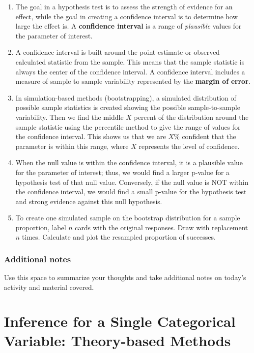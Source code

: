 \documentclass[
]{report}
\begin{document}
\begin{enumerate}
\def\labelenumi{\arabic{enumi}.}
\item
  The goal in a hypothesis test is to assess the strength of evidence for an effect, while the goal in creating a confidence interval is to determine how large the effect is. A \textbf{confidence interval} is a range of \emph{plausible} values for the parameter of interest.
\item
  A confidence interval is built around the point estimate or observed calculated statistic from the sample. This means that the sample statistic is always the center of the confidence interval. A confidence interval includes a measure of sample to sample variability represented by the \textbf{margin of error}.
\item
  In simulation-based methods (bootstrapping), a simulated distribution of possible sample statistics is created showing the possible sample-to-sample variability. Then we find the middle \(X\) percent of the distribution around the sample statistic using the percentile method to give the range of values for the confidence interval. This shows us that we are \(X\)\% confident that the parameter is within this range, where \(X\) represents the level of confidence.
\item
  When the null value is within the confidence interval, it is a plausible value for the parameter of interest; thus, we would find a larger p-value for a hypothesis test of that null value. Conversely, if the null value is NOT within the confidence interval, we would find a small p-value for the hypothesis test and strong evidence against this null hypothesis.
\item
  To create one simulated sample on the bootstrap distribution for a sample proportion, label \(n\) cards with the original responses. Draw with replacement \(n\) times. Calculate and plot the resampled proportion of successes.
\end{enumerate}

\subsection{Additional notes}\label{additional-notes-5}

Use this space to summarize your thoughts and take additional notes on today's activity and material covered.

\newpage

\chapter{Inference for a Single Categorical Variable: Theory-based Methods}\label{inference-for-a-single-categorical-variable-theory-based-methods}
\end{document}
